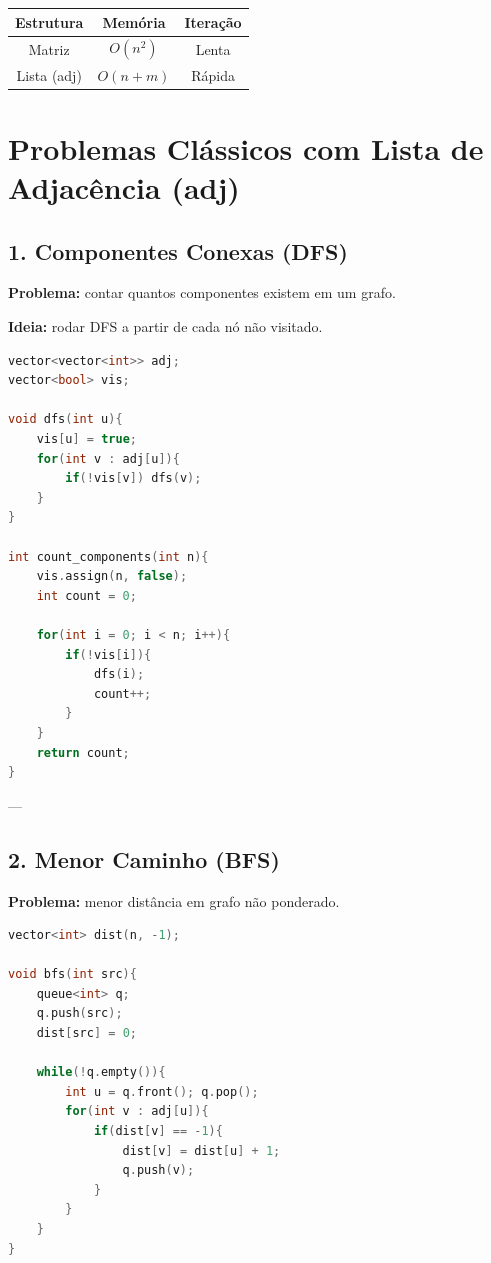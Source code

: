 \documentclass[11pt]{article}
\begin{document}
\begin{center}
\begin{tabular}{|c|c|c|}
\hline
Estrutura & Memória & Iteração \\
\hline
Matriz & $O(n^2)$ & Lenta \\
Lista (adj) & $O(n+m)$ & Rápida \\
\hline
\end{tabular}
\end{center}

\section{Problemas Clássicos com Lista de Adjacência (adj)}

\subsection{1. Componentes Conexas (DFS)}

\textbf{Problema:} contar quantos componentes existem em um grafo.

\textbf{Ideia:} rodar DFS a partir de cada nó não visitado.

\begin{lstlisting}[language=C++]
vector<vector<int>> adj;
vector<bool> vis;

void dfs(int u){
    vis[u] = true;
    for(int v : adj[u]){
        if(!vis[v]) dfs(v);
    }
}

int count_components(int n){
    vis.assign(n, false);
    int count = 0;

    for(int i = 0; i < n; i++){
        if(!vis[i]){
            dfs(i);
            count++;
        }
    }
    return count;
}
\end{lstlisting}

---

\subsection{2. Menor Caminho (BFS)}

\textbf{Problema:} menor distância em grafo não ponderado.

\begin{lstlisting}[language=C++]
vector<int> dist(n, -1);

void bfs(int src){
    queue<int> q;
    q.push(src);
    dist[src] = 0;

    while(!q.empty()){
        int u = q.front(); q.pop();
        for(int v : adj[u]){
            if(dist[v] == -1){
                dist[v] = dist[u] + 1;
                q.push(v);
            }
        }
    }
}
\end{lstlisting}
\end{document}
